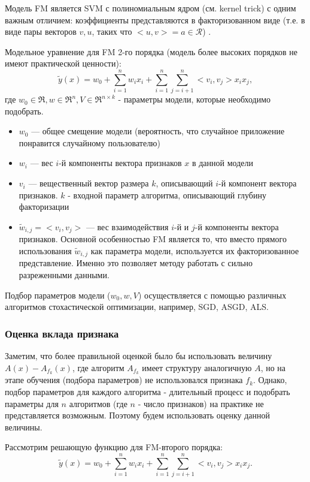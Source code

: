 \documentclass[12pt,a4paper]{report}
\begin{document}
Модель FM является SVM с полиномиальным ядром (см. kernel trick) с одним важным отличием: коэффициенты представляются в факторизованном виде (т.е. в виде пары векторов $v, u$, таких что $<u,v> = a \in \mathcal{R}$) \cite{Fm}.

Модельное уравнение для FM 2-го порядка (модель более высоких порядков не имеют практической ценности):
\begin{equation}
\tilde{y}(x) = w_0 + \sum_{i=1}^{n}w_ix_i + \sum_{i=1}^{n}\sum_{j=i+1}^{n}<v_i, v_j>x_ix_j,
\end{equation}
где $w_0 \in \mathfrak{R}, w \in \mathfrak{R}^n, V \in \mathfrak{R}^{n \times k}$ - параметры модели, которые необходимо подобрать.
\begin{itemize}
\item $w_0$ --- общее смещение модели (вероятность, что случайное приложение понравится случайному пользователю)
\item $w_i$ --- вес $i$-й компоненты вектора признаков $x$ в данной модели
\item $v_i$ --- вещественный вектор размера $k$, описывающий $i$-й компонент вектора признаков. $k$ -  входной параметр алгоритма, описывающий глубину факторизации
\item $\tilde{w}_{i,j} = <v_i, v_j>$ --- вес взаимодействия $i$-й и $j$-й компоненты вектора признаков. Основной особенностью FM является то, что вместо прямого использования $\tilde{w}_{i,j}$ как параметра модели, используется их факторизованное представление. Именно это позволяет методу работать с сильно разреженными данными.
\end{itemize}

Подбор параметров модели ($w_0, w, V$) осуществляется с помощью различных алгоритмов стохастической оптимизации, например, SGD, ASGD, ALS.

\subsubsection{Оценка вклада признака}
Заметим, что более правильной оценкой было бы использовать величину $A(x) - A_{f_k}(x)$, где алгоритм $A_{f_k}$ имеет структуру аналогичную $A$, но на этапе обучения (подбора параметров) не использовался признака $f_k$. Однако, подбор параметров для каждого алгоритма - длительный процесс и подобрать параметры для $n$ алгоритмов (где $n$ - число признаков) на практике не представляется возможным. Поэтому будем использовать оценку данной величины.

Рассмотрим решающую функцию для FM-второго порядка:
\begin{equation*}
\tilde{y}(x) = w_0 + \sum_{i=1}^{n}w_ix_i + \sum_{i=1}^{n}\sum_{j=i+1}^{n}<v_i, v_j>x_ix_j.
\end{equation*}
\end{document}
